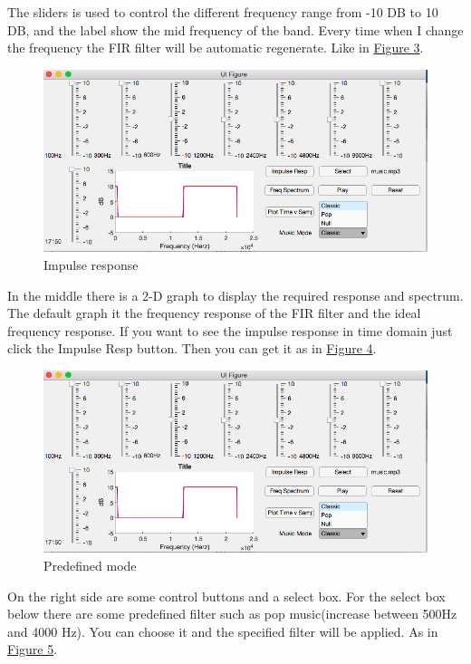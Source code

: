 \documentclass[titlepage]{article}
\begin{document}
The sliders is used to control the different frequency range from -10 DB to
10 DB, and the label show the mid frequency of the band. Every time when I
change the frequency the FIR filter will be automatic regenerate. Like in
\hyperref[fig:org01fa1fb]{Figure 3}.

\begin{figure}[htbp]
\caption{\label{fig:org50f9af5}
Impulse response}
\centering
\includegraphics[width=12cm]{./img/5.png}
\end{figure}

In the middle there is a 2-D graph to display the required response and spectrum.
The default graph it the frequency response of the FIR filter and the ideal
frequency response. If you want to see the impulse response in time domain
just click the Impulse Resp button. Then you can get it as in \hyperref[fig:org50f9af5]{Figure 4}.

\begin{figure}[htbp]
\caption{\label{fig:org146612e}
Predefined mode}
\centering
\includegraphics[width=12cm]{./img/5.png}
\end{figure}

On the right side are some control buttons and a select box. For the select
box below there are some predefined filter such as pop music(increase between
500Hz and 4000 Hz). You can choose it and the specified filter will be
applied. As in \hyperref[fig:org146612e]{Figure 5}.
\end{document}
